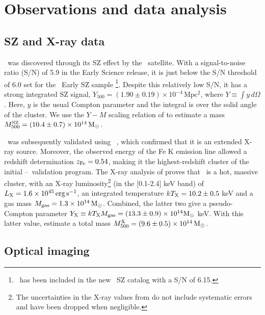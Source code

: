\section{Observations and data analysis}

\subsection{SZ and X-ray data}\label{s:previous}

\plck\ was discovered through its SZ effect by the \planck\ satellite. With a signal-to-noise ratio
(S/N) of 5.9 in the Early Science release, it is just below the S/N threshold of 6.0 set for the 
\planck\ Early SZ sample \citep{planck11viii}\footnote{\plck\ has been included in the new \planck\ 
SZ catalog \citep{planck13xxix} with a S/N of 6.15.}. Despite this relatively low S/N, it has a strong
integrated SZ signal, $Y_{500} = (1.90\pm0.19)\times10^{-4}\,\mathrm{Mpc^2}$, where $Y \equiv \int
y\,d\Omega$. Here, $y$ is the usual Compton parameter and the integral is over the solid angle of
the cluster. We use the $Y-M$ scaling relation of \cite{planck11xi} to estimate a mass
$M_{500}^{\rm SZ}=(10.4\pm0.7)\times10^{14}\,{\rm M}_\odot$.

\plck\ was subsequently validated using \xmm\ \citep{planck11ix}, which confirmed that it is an
extended X-ray source. Moreover, the observed energy of the Fe K emission line allowed a redshift
determination $z_{\rm Fe}=0.54$, making it the highest-redshift cluster of the initial
\planck--\xmm\ validation program. The X-ray analysis of \cite{planck11ix} proves that \plck\ is a
hot, massive cluster, with an X-ray luminosity\footnote{The uncertainties in the X-ray values from
\cite{planck11ix} do not include systematic errors and have been dropped when negligible.} (in the
[0.1-2.4] keV band) of $L_{\rm X}=1.6\times10^{45}\,\mathrm{erg\,s^{-1}}$, an integrated temperature
$kT_{\rm X}=10.2\pm0.5$ keV and a gas mass $M_{\rm gas}=1.3\times10^{14}\,{\rm M}_\odot$. Combined, the latter
two give a pseudo-Compton parameter
$Y_{\rm X} \equiv kT_{\rm X} M_{\rm gas} = \left(13.3\pm0.9\right)\times10^{14}{\rm M}_\odot$ keV.
With this latter value, \cite{planck11ix} estimate a total mass 
$M_{500}^{\rm X}=\left(9.6\pm0.5\right)\times10^{14}\,{\rm M}_\odot$.

\subsection{Optical imaging}\label{s:img}

